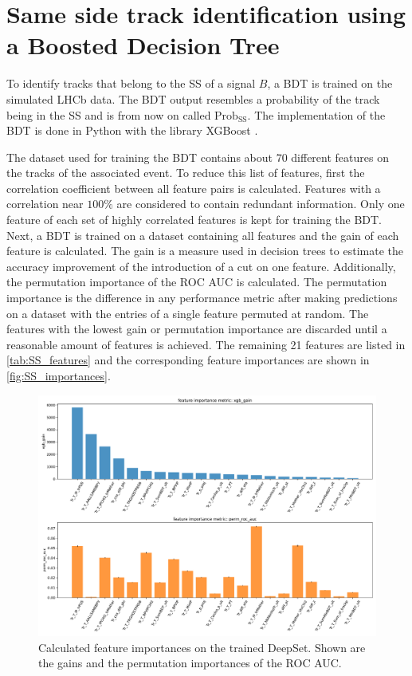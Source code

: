 \section{Same side track identification using a Boosted Decision Tree}
\label{sec:SS_classifier}

To identify tracks that belong to the SS of a signal $B$, a BDT is trained on the simulated LHCb data. 
The BDT output resembles a probability of the track being in the SS and is from now on called $\text{Prob}_\text{SS}$.
The implementation of the BDT is done in Python with the library XGBoost \cite{xgboost}.

The dataset used for training the BDT contains about 70 different features on the tracks of the associated event.
To reduce this list of features, first the correlation coefficient between all feature pairs is calculated.
Features with a correlation near $100\%$ are considered to contain redundant information.
Only one feature of each set of highly correlated features is kept for training the BDT.
Next, a BDT is trained on a dataset containing all features and the gain of each feature is calculated.
The gain is a measure used in decision trees to estimate the accuracy improvement of the introduction of a cut on one feature.
Additionally, the permutation importance of the ROC AUC is calculated.
The permutation importance is the difference in any performance metric after making predictions on a dataset with the entries of a single feature permuted at random.
The features with the lowest gain or permutation importance are discarded until a reasonable amount of features is achieved.
The remaining 21 features are listed in \autoref{tab:SS_features} and the corresponding feature importances are shown in \autoref{fig:SS_importances}.

\begin{figure}
    \centering
    \includegraphics[width=\textwidth]{images/SS_feature_importances.pdf}
    \caption{Calculated feature importances on the trained DeepSet. Shown are the gains and the permutation importances of the ROC AUC.}
    \label{fig:SS_importances}
\end{figure}

